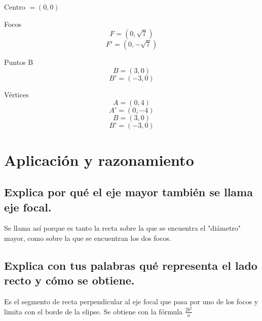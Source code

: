 \documentclass{article}
\begin{document}
Centro $=(0,0)$

Focos $$F=(0,\sqrt{7})$$ $$F'=(0,-\sqrt{7})$$

Puntos B $$B=(3,0)$$ $$B'=(-3,0)$$

Vértices $$A=(0,4)$$ $$A'=(0,-4)$$ $$B=(3,0)$$ $$B'=(-3,0)$$

\section{Aplicación y razonamiento}
\subsection{Explica por qué el eje mayor también se llama eje focal.}
Se llama así porque es tanto la recta sobre la que se encuentra el "diámetro" mayor, como sobre la que se encuentran los dos focos.
\subsection{Explica con tus palabras qué representa el lado recto y cómo se obtiene.}
Es el segmento de recta perpendicular al eje focal que pasa por uno de los focos y limita con el borde de la elipse. Se obtiene con la fórmula $\frac{2b^2}{a}$
\end{document}
